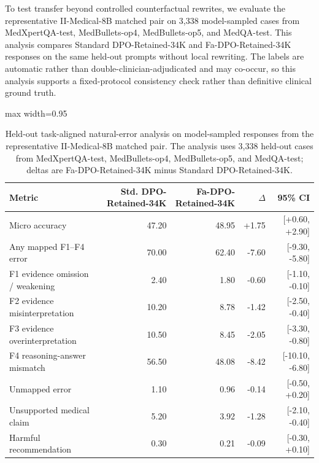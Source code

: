 \documentclass[a4paper,fleqn,doubleblind]{cas-sc}
\begin{document}
To test transfer beyond controlled counterfactual rewrites, we evaluate the representative II-Medical-8B matched pair on 3,338 model-sampled cases from MedXpertQA-test, MedBullets-op4, MedBullets-op5, and MedQA-test. This analysis compares Standard DPO-Retained-34K and Fa-DPO-Retained-34K responses on the same held-out prompts without local rewriting. The labels are automatic rather than double-clinician-adjudicated and may co-occur, so this analysis supports a fixed-protocol consistency check rather than definitive clinical ground truth.

\begin{table}[htbp]
    \centering
    \footnotesize
    \caption{Held-out task-aligned natural-error analysis on model-sampled responses from the representative II-Medical-8B matched pair. The analysis uses 3,338 held-out cases from MedXpertQA-test, MedBullets-op4, MedBullets-op5, and MedQA-test; deltas are Fa-DPO-Retained-34K minus Standard DPO-Retained-34K.}
    \label{tab:heldout_natural_error_analysis}
    \begin{adjustbox}{max width=0.95\textwidth}
    \begin{tabular}{lrrrr}
        \toprule
        \textbf{Metric} & \textbf{Std. DPO-Retained-34K} & \textbf{Fa-DPO-Retained-34K} & \textbf{$\Delta$} & \textbf{95\% CI} \\
        \midrule
        Micro accuracy & 47.20 & 48.95 & +1.75 & [+0.60, +2.90] \\
        Any mapped F1--F4 error & 70.00 & 62.40 & -7.60 & [-9.30, -5.80] \\
        F1 evidence omission / weakening & 2.40 & 1.80 & -0.60 & [-1.10, -0.10] \\
        F2 evidence misinterpretation & 10.20 & 8.78 & -1.42 & [-2.50, -0.40] \\
        F3 evidence overinterpretation & 10.50 & 8.45 & -2.05 & [-3.30, -0.80] \\
        F4 reasoning-answer mismatch & 56.50 & 48.08 & -8.42 & [-10.10, -6.80] \\
        Unmapped error & 1.10 & 0.96 & -0.14 & [-0.50, +0.20] \\
        Unsupported medical claim & 5.20 & 3.92 & -1.28 & [-2.10, -0.40] \\
        Harmful recommendation & 0.30 & 0.21 & -0.09 & [-0.30, +0.10] \\
        \bottomrule
    \end{tabular}
    \end{adjustbox}
\end{table}
\end{document}
